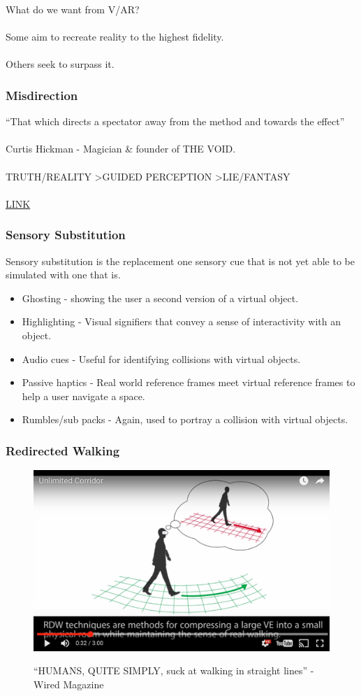 \begin{frame}
	What do we want from V/AR? \\~\\
	Some aim to recreate reality to the highest fidelity. \\~\\
	Others seek to surpass it.
\end{frame}


\begin{frame}
	\frametitle{Misdirection}
	``That which directs a spectator away from the method and towards the effect'' \\~\\
	Curtis Hickman - Magician \& founder of THE VOID. \\~\\
	TRUTH/REALITY \textgreater  GUIDED PERCEPTION \textgreater  LIE/FANTASY \\~\\
	\href{https://www.youtube.com/watch?v=Ebwtq1HZJ2A}{LINK}
\end{frame}


\begin{frame}
	\frametitle{Sensory Substitution}
	Sensory substitution is the replacement one sensory cue that is not yet able to be simulated with one that is. 
	\begin{itemize}
		\item Ghosting - showing the user a second version of a virtual object. 
		\item Highlighting - Visual signifiers that convey a sense of interactivity with an object.
		\item Audio cues - Useful for identifying collisions with virtual objects.  
		\item Passive haptics - Real world reference frames meet virtual reference frames to help a user navigate a space. 
		\item Rumbles/sub packs - Again, used to portray a collision with virtual objects. 
	\end{itemize}
\end{frame}
	
\begin{frame}
	\frametitle{Redirected Walking}
	\begin{figure}
		\href{https://www.youtube.com/watch?v=THk92rev1VA}{ \includegraphics[scale=.2]{assets/directed}  }
		\caption{``HUMANS, QUITE SIMPLY, suck at walking in straight lines'' - Wired Magazine}
	\end{figure}
		
\end{frame}



